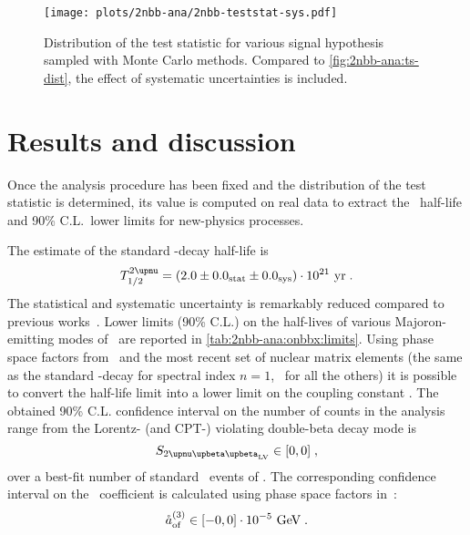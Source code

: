 \begin{figure}
  \centering
  \texttt{[image: plots/2nbb-ana/2nbb-teststat-sys.pdf]}
  \caption{%
    Distribution of the test statistic for various signal hypothesis sampled with Monte
    Carlo methods. Compared to \cref{fig:2nbb-ana:ts-dist}, the effect of systematic
    uncertainties is included. 
  }\label{fig:2nbb-ana:ts-dist-sys}
\end{figure}

\begin{table}
  \centering
  \caption{%
    Summary of the systematic uncertainties affecting the \nnbb\ distribution analysis.
  }\label{tab:2nbb-ana:systematics}
  
\end{table}

\section{Results and discussion}%
\label{sec:2nbb-ana:results}

Once the analysis procedure has been fixed and the distribution of the test statistic is
determined, its value is computed on real data to extract the \nnbb\ half-life and 90\%
C.L.~lower limits for new-physics processes.

The estimate of the standard \nnbb-decay half-life is
\[
  \thalftwoM = (2.0 \pm \stat{0.0} \pm \syst{0.0}) \cdot 10^{21}~\text{yr} \;.
\]
The statistical and systematic uncertainty is remarkably reduced compared to previous
works~\cite{Agostini2015a}.
\newpar
Lower limits (90\% C.L.) on the half-lives of various Majoron-emitting modes of \onbb\ are
reported in \cref{tab:2nbb-ana:onbbx:limits}. Using phase space factors
from~\cite{Kotila2015} and the most recent set of nuclear matrix elements (the same as the
standard \onbb-decay for spectral index $n=1$,~\cite{Hirsch1995} for all the others) it is
possible to convert the half-life limit into a lower limit on the coupling constant \ga.
\newpar
The obtained 90\% C.L. confidence interval on the number of counts in the analysis range
from the Lorentz- (and CPT-) violating double-beta decay mode is
\[
  S_\nnbblvM \in [0,0] \;,
\]
over a best-fit number of standard \nnbb\ events of . The corresponding
confidence interval on the \aof\ coefficient is calculated using phase space factors
in~\cite{Nitescu2020}:
\[
  {\mathring{a}_\text{of}^{(3)}} \in [-0, 0] \cdot 10^{-5}~\text{GeV} \;.
\]



